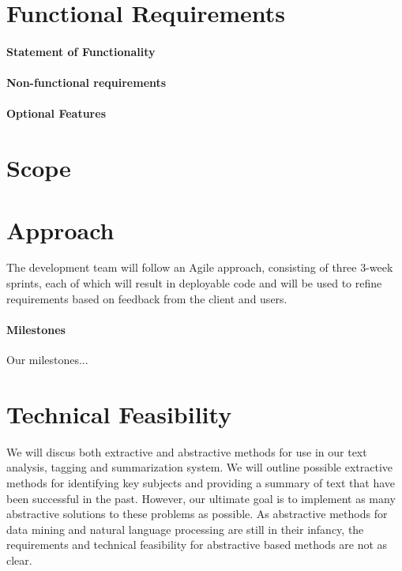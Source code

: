 \documentclass[12pt]{article}
\begin{document}
%
%

\section{Functional Requirements}

\paragraph{Statement of Functionality}

\paragraph{Non-functional requirements}

\paragraph{Optional Features}

%
%

\section{Scope}

%
%

\section{Approach}

The development team will follow an Agile approach, consisting of three 3-week sprints, each of which will result in deployable code and will be used to refine requirements based on feedback from the client and users.

\paragraph{Milestones}
Our milestones...

%
%

\section{Technical Feasibility }
We will discus both extractive and abstractive methods for use in our text analysis, tagging and summarization system. We will outline possible extractive methods for identifying key subjects and providing a summary of text that have been successful in the past. However, our ultimate goal is to implement as many abstractive solutions to these problems as possible. As abstractive methods for data mining and natural language processing are still in their infancy, the requirements and technical feasibility for abstractive based methods are not as clear.
\end{document}
